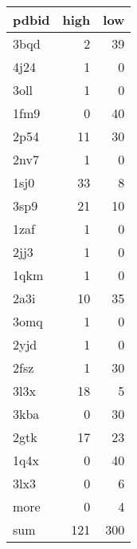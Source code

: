 \begin{tabular}{lrr}
\hline
 pdbid   &   high &   low \\
\hline
 3bqd    &      2 &    39 \\
 4j24    &      1 &     0 \\
 3oll    &      1 &     0 \\
 1fm9    &      0 &    40 \\
 2p54    &     11 &    30 \\
 2nv7    &      1 &     0 \\
 1sj0    &     33 &     8 \\
 3sp9    &     21 &    10 \\
 1zaf    &      1 &     0 \\
 2jj3    &      1 &     0 \\
 1qkm    &      1 &     0 \\
 2a3i    &     10 &    35 \\
 3omq    &      1 &     0 \\
 2yjd    &      1 &     0 \\
 2fsz    &      1 &    30 \\
 3l3x    &     18 &     5 \\
 3kba    &      0 &    30 \\
 2gtk    &     17 &    23 \\
 1q4x    &      0 &    40 \\
 3lx3    &      0 &     6 \\
 more    &      0 &     4 \\
 sum     &    121 &   300 \\
\hline
\end{tabular}